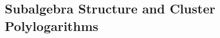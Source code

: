\documentclass[12pt]{article}
\def\x{\mathcal{X}}
\def\draftnote#1{{\color{red} $\bigstar$ }{\bf [#1]}}
\begin{document}
\subsection{Subalgebra Structure and Cluster Polylogarithms}

\end{document}
